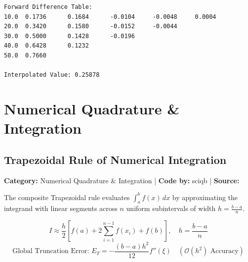 \documentclass[10pt,a4paper]{report}
\begin{document}
\begin{tcolorbox}[colback=termbg,colframe=primary,title=\textbf{Program Execution Output \& Convergence Table},boxrule=1pt,arc=2mm]
\begin{lstlisting}[style=terminal_output]
Forward Difference Table:
10.0  0.1736      0.1684      -0.0104     -0.0048     0.0004      
20.0  0.3420      0.1580      -0.0152     -0.0044     
30.0  0.5000      0.1428      -0.0196     
40.0  0.6428      0.1232      
50.0  0.7660      

Interpolated Value: 0.25878
\end{lstlisting}
\end{tcolorbox}

\newpage

\chapter{Numerical Quadrature \& Integration}


\section{Trapezoidal Rule of Numerical Integration}
\textbf{Category:} \textcolor{secondary}{Numerical Quadrature \& Integration} \quad | \quad \textbf{Code by:} \textcolor{secondary}{sciqb} \quad | \quad \textbf{Source:} \texttt{}

The composite Trapezoidal rule evaluates $\int_a^b f(x)\,dx$ by approximating the integrand with linear segments across $n$ uniform subintervals of width $h = \frac{b-a}{n}$.

\begin{tcolorbox}[colback=theorybg,colframe=theoryframe,title=\textbf{Mathematical Theory \& Formulation},boxrule=1pt,arc=2mm]
\[
I \approx \frac{h}{2}\left[f(a) + 2 \sum_{i=1}^{n-1} f(x_i) + f(b)\right], \quad h = \frac{b - a}{n}
\]
\[
\text{Global Truncation Error: } E_T = -\frac{(b - a) h^2}{12} f''(\xi) \quad (\mathcal{O}(h^2) \text{ Accuracy})
\]
\end{tcolorbox}
\end{document}
